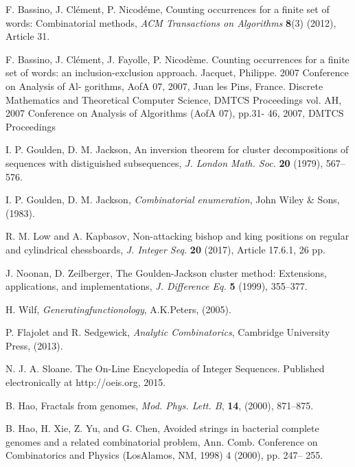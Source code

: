 \documentclass[12pt]{report}
\begin{document}
{{\newpage









\begin{thebibliography}{99}


 F. Bassino, J. Clément, P. Nicodéme, Counting occurrences for a finite set of words: Combinatorial methods, {\em ACM Transactions on Algorithms} {\bf 8}(3) (2012), Article 31.

 F. Bassino, J. Clément, J. Fayolle, P. Nicodème. Counting occurrences for a finite set of words: an inclusion-exclusion approach. Jacquet, Philippe. 2007 Conference on Analysis of Al-
gorithms, AofA 07, 2007, Juan les Pins, France. Discrete Mathematics and Theoretical Computer
Science, DMTCS Proceedings vol. AH, 2007 Conference on Analysis of Algorithms (AofA 07), pp.31-
46, 2007, DMTCS Proceedings

 I. P. Goulden, D. M. Jackson, An inversion theorem for cluster decompositions of sequences with distiguished subsequences, {\em J. London Math. Soc.} {\bf 20} (1979), 567--576.

 I. P. Goulden, D. M. Jackson, {\em Combinatorial enumeration}, John Wiley \& Sons, (1983).

 R. M. Low and A. Kapbasov, Non-attacking bishop and king positions on regular and cylindrical chessboards, {\em J. Integer Seq.} {\bf 20}
(2017), Article 17.6.1, 26 pp.

 J. Noonan, D. Zeilberger, The Goulden-Jackson cluster method: Extensions, applications, and implementations, {\em J. Difference Eq.} {\bf 5} (1999), 355--377.

 H. Wilf, {\em Generatingfunctionology}, A.K.Peters, (2005).

 P. Flajolet and R. Sedgewick, {\em Analytic Combinatorics}, Cambridge University Press, (2013).


  N. J. A. Sloane. The On-Line Encyclopedia of Integer Sequences. Published electronically at http://oeis.org, 2015.


 B. Hao, Fractals from genomes, {\em Mod. Phys. Lett. B}, {\bf 14}, (2000), 871--875.


 B. Hao, H. Xie, Z. Yu, and G. Chen, Avoided strings in bacterial complete genomes and a related combinatorial problem, Ann. Comb. Conference on Combinatorics and Physics (LosAlamos, NM, 1998) 4 (2000), pp. 247– 255.


\end{thebibliography}}}
\end{document}
